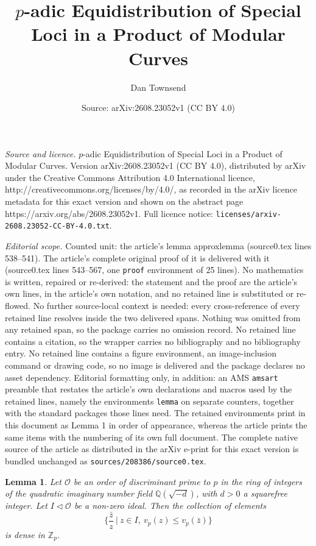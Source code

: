 \documentclass[10pt,a4paper]{amsart}
\title{$p$-adic Equidistribution of Special Loci in a Product of Modular Curves}
\author{Dan Townsend}
\date{Source: arXiv:2608.23052v1 (CC BY 4.0)}
\newcommand{\zed}{\ensuremath{\mathbb{Z}}}
\newcommand{\kew}{\ensuremath{\mathbb{Q}}}
\newcommand{\oh}{\ensuremath{\mathcal{O}}}
\newtheorem{lemma}{Lemma}
\begin{document}
\maketitle

\noindent\emph{Source and licence.} $p$-adic Equidistribution of Special Loci in a Product of Modular Curves. Version arXiv:2608.23052v1 (CC BY 4.0), distributed by arXiv under the Creative Commons Attribution 4.0 International licence, http://creativecommons.org/licenses/by/4.0/, as recorded in the arXiv licence metadata for this exact version and shown on the abstract page https://arxiv.org/abs/2608.23052v1. Full licence notice: \texttt{licenses/arxiv-2608.23052-CC-BY-4.0.txt}.\par\smallskip

\noindent\textit{Editorial scope.} Counted unit: the article's lemma approxlemma (source0.tex lines 538--541). The article's complete original proof of it is delivered with it (source0.tex lines 543--567, one \texttt{proof} environment of 25 lines). No mathematics is written, repaired or re-derived: the statement and the proof are the article's own lines, in the article's own notation, and no retained line is substituted or re-flowed.  No further source-local context is needed: every cross-reference of every retained line resolves inside the two delivered spans.  Nothing was omitted from any retained span, so the package carries no omission record.  No retained line contains a citation, so the wrapper carries no bibliography and no bibliography entry.  No retained line contains a figure environment, an image-inclusion command or drawing code, so no image is delivered and the package declares no asset dependency.  Editorial formatting only, in addition: an AMS \texttt{amsart} preamble that restates the article's own declarations and macros used by the retained lines, namely the environments \texttt{lemma} on separate counters, together with the standard packages those lines need.  The retained environments print in this document as Lemma 1 in order of appearance, whereas the article prints the same items with the numbering of its own full document.  The complete native source of the article as distributed in the arXiv e-print for this exact version is bundled unchanged as \texttt{sources/208386/source0.tex}.
	\begin{lemma} \label{approxlemma}
		Let $\oh$ be an order of discriminant prime to $p$ in the ring of integers of the quadratic imaginary number field $\kew(\sqrt{-d})$, with $d>0$ a squarefree integer. Let $I\triangleleft \oh$ be a non-zero ideal. Then the collection of elements
		\[\{ \frac{\bar{z}}{z}\ |\ z\in I,\ v_p(z)\leq v_p(\bar{z})\}\] is dense in $\zed_p$. 
	\end{lemma}
\end{document}
